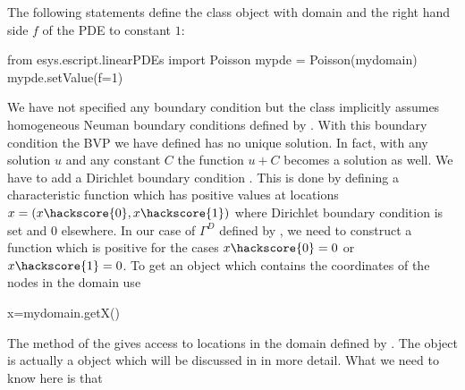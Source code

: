 The following statements define the \Poisson class object  with domain  and
the right hand side $f$ of the PDE to constant $1$: 
\begin{python}
  from esys.escript.linearPDEs import Poisson
  mypde = Poisson(mydomain)
  mypde.setValue(f=1)
\end{python}
We have not specified any boundary condition but the 
\Poisson class implicitly assumes homogeneous Neuman boundary conditions  defined by . With this boundary 
condition the BVP we have defined has no unique solution. In fact, with any solution $u$
and any constant $C$ the function $u+C$ becomes a solution as well. We have to add 
a Dirichlet boundary condition . This is done 
by defining a characteristic function  
which has positive values at locations $x=(x\hackscore{0},x\hackscore{1})$ where Dirichlet boundary condition is set
and $0$ elsewhere. In our case of $\Gamma^D$ defined by ,
we need to construct a function  which is positive for the cases $x\hackscore{0}=0$ or $x\hackscore{1}=0$. To get 
an object  which contains the coordinates of the nodes in the domain use
\begin{python}
  x=mydomain.getX() 
\end{python}
The method  of the \Domain {} 
gives access to locations 
in the domain defined by . The object  is actually a \Data object which will be
discussed in  in more detail. What we need to know here is that 

